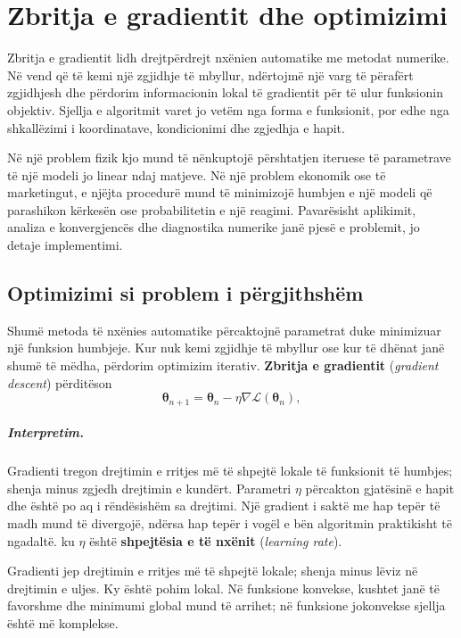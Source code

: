 \documentclass[12pt,a4paper,oneside]{book}
\newcommand{\term}[2]{\textbf{#1} (\textit{#2})}
\begin{document}
\chapter[Optimizimi me gradient]{Zbritja e gradientit dhe optimizimi}

Zbritja e gradientit lidh drejtpërdrejt nxënien automatike me metodat numerike. Në vend që të kemi një zgjidhje të mbyllur, ndërtojmë një varg të përafërt zgjidhjesh dhe përdorim informacionin lokal të gradientit për të ulur funksionin objektiv. Sjellja e algoritmit varet jo vetëm nga forma e funksionit, por edhe nga shkallëzimi i koordinatave, kondicionimi dhe zgjedhja e hapit.

Në një problem fizik kjo mund të nënkuptojë përshtatjen iteruese të parametrave të një modeli jo linear ndaj matjeve. Në një problem ekonomik ose të marketingut, e njëjta procedurë mund të minimizojë humbjen e një modeli që parashikon kërkesën ose probabilitetin e një reagimi. Pavarësisht aplikimit, analiza e konvergjencës dhe diagnostika numerike janë pjesë e problemit, jo detaje implementimi.
\section{Optimizimi si problem i përgjithshëm}

Shumë metoda të nxënies automatike përcaktojnë parametrat duke minimizuar një funksion humbjeje. Kur nuk kemi zgjidhje të mbyllur ose kur të dhënat janë shumë të mëdha, përdorim optimizim iterativ. \term{Zbritja e gradientit}{gradient descent} përditëson
\[
\boldsymbol\theta_{n+1}=\boldsymbol\theta_n-\eta\nabla \mathcal L(\boldsymbol\theta_n),
\]

\paragraph{Interpretim.}
Gradienti tregon drejtimin e rritjes më të shpejtë lokale të funksionit të humbjes; shenja minus zgjedh drejtimin e kundërt. Parametri $\eta$ përcakton gjatësinë e hapit dhe është po aq i rëndësishëm sa drejtimi. Një gradient i saktë me hap tepër të madh mund të divergojë, ndërsa hap tepër i vogël e bën algoritmin praktikisht të ngadaltë.
ku $\eta$ është \term{shpejtësia e të nxënit}{learning rate}.

Gradienti jep drejtimin e rritjes më të shpejtë lokale; shenja minus lëviz në drejtimin e uljes. Ky është pohim lokal. Në funksione konvekse, kushtet janë të favorshme dhe minimumi global mund të arrihet; në funksione jokonvekse sjellja është më komplekse.
\end{document}
